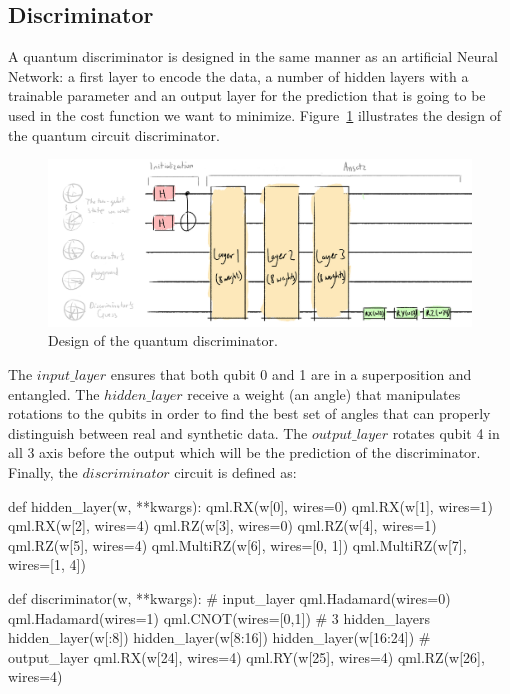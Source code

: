 \subsection{Discriminator}
\label{sec:disc}

A quantum discriminator is designed in the same manner as an artificial Neural
Network: a first layer to encode the data, a number of hidden layers with a 
trainable parameter and an output layer for the prediction that is going to be 
used in the cost function we want to minimize. Figure~\ref{fig:disc} illustrates
the design of the quantum circuit discriminator.

\begin{figure}[!htbp]
\centering
    \includegraphics[width=1\textwidth]{figures/discriminator.pdf}
\caption{Design of the quantum discriminator.}
\label{fig:disc}
\end{figure}

The $input\_layer$ ensures that both qubit 0 and 1 are in a superposition and 
entangled. The $hidden\_layer$ receive a weight (an angle) that manipulates 
rotations to the qubits in order to find the best set of angles that can properly
distinguish between real and synthetic data. The $output\_layer$ rotates qubit 4
in all 3 axis before the output which will be the prediction of the discriminator.
Finally, the $discriminator$ circuit is defined as:
\begin{python}
def hidden_layer(w, **kwargs):
    qml.RX(w[0], wires=0)
    qml.RX(w[1], wires=1)
    qml.RX(w[2], wires=4)
    qml.RZ(w[3], wires=0)
    qml.RZ(w[4], wires=1)
    qml.RZ(w[5], wires=4)
    qml.MultiRZ(w[6], wires=[0, 1])
    qml.MultiRZ(w[7], wires=[1, 4])

def discriminator(w, **kwargs):
    # input_layer
    qml.Hadamard(wires=0)
    qml.Hadamard(wires=1)
    qml.CNOT(wires=[0,1])
    # 3 hidden_layers
    hidden_layer(w[:8])
    hidden_layer(w[8:16]) 
    hidden_layer(w[16:24])
    # output_layer
    qml.RX(w[24], wires=4)
    qml.RY(w[25], wires=4)
    qml.RZ(w[26], wires=4)
\end{python}

